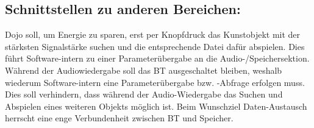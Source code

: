 \subsection{Schnittstellen zu anderen Bereichen:}
Dojo soll, um Energie zu sparen, erst per Knopfdruck das Kunstobjekt mit der stärksten Signalstärke suchen und die entsprechende Datei dafür abspielen. Dies führt Software-intern zu einer Parameterübergabe an die Audio-/Speichersektion. Während der Audiowiedergabe soll das BT ausgeschaltet bleiben, weshalb wiederum Software-intern eine Parameterübergabe bzw. -Abfrage erfolgen muss. Dies soll verhindern, dass während der Audio-Wiedergabe das Suchen und Abspielen eines weiteren Objekts möglich ist. Beim Wunschziel Daten-Austausch herrscht eine enge Verbundenheit zwischen BT und Speicher. 
